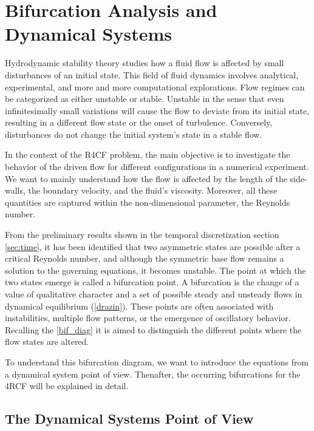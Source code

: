 
\section{Bifurcation Analysis and Dynamical Systems} \label{sec:bif}

Hydrodynamic stability theory studies how a fluid flow is affected by small
disturbances of an initial state. This field of fluid dynamics involves
analytical, experimental, and more and more computational explorations. Flow
regimes can be categorized as either unstable or stable. Unstable in the sense
that even infinitesimally small variations will cause the flow to deviate from
its initial state, resulting in a different flow state or the onset of
turbulence. Conversely, disturbances do not change the initial system's state in
a stable flow.

In the context of the R4CF problem, the main objective is to investigate the
behavior of the driven flow for different configurations in a numerical
experiment. We want to mainly understand how the flow is affected by the length
of the side-walls, the boundary velocity, and the fluid's viscosity. Moreover, all
these quantities are captured within the non-dimensional parameter, the
Reynolds number.

From the preliminary results shown in the temporal discretization section
\ref{sec:time}, it has been identified that two asymmetric states are possible
after a critical Reynolds number, and although the symmetric base flow remains
a solution to the governing equations, it becomes unstable. The point at which
the two states emerge is called a bifurcation point. A bifurcation is the
change of a value of qualitative character and a set of possible steady and
unsteady flows in dynamical equilibrium (\ref{drazin}). These points are often
associated with instabilities, multiple flow patterns, or the emergence of
oscillatory behavior. Recalling the \ref{bif_diag} it is aimed to distinguish
the different points where the flow states are altered. 

To understand this bifurcation diagram, we want to introduce the equations from
a dynamical system point of view. Thenafter, the occurring bifurcations for the
4RCF will be explained in detail.

\subsection{The Dynamical Systems Point of View}


